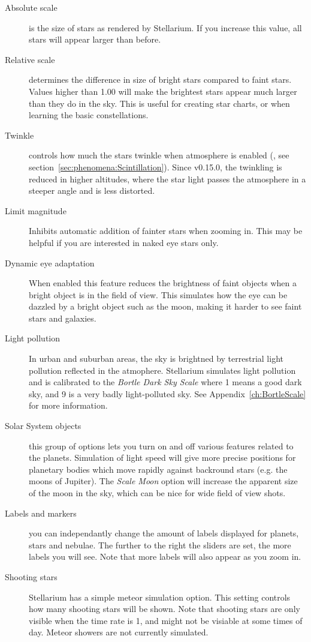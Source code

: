 \begin{description}
\item[Absolute scale] is the size of stars as rendered by
  Stellarium. If you increase this value, all stars will appear larger
  than before.
\item[Relative scale] determines the difference in size of bright
  stars compared to faint stars. Values higher than 1.00 will make the
  brightest stars appear much larger than they do in the sky. This is
  useful for creating star charts, or when learning the basic
  constellations.
\item[Twinkle] controls how much the stars twinkle when atmosphere is
  enabled (, see section~\ref{sec:phenomena:Scintillation}). 
  Since v0.15.0, the twinkling is reduced in higher altitudes,
  where the star light passes the atmosphere in a steeper angle and is
  less distorted.
\item[Limit magnitude] Inhibits automatic addition of fainter stars
  when zooming in. This may be helpful if you are interested in naked
  eye stars only.
\item[Dynamic eye adaptation] When enabled this feature reduces the
  brightness of faint objects when a bright object is in the field of
  view. This simulates how the eye can be dazzled by a bright object
  such as the moon, making it harder to see faint stars and galaxies.
\item[Light pollution] In urban and suburban areas, the sky is
  brightned by terrestrial light pollution reflected in the atmophere.
  Stellarium simulates light pollution and is calibrated to the
  \emph{Bortle Dark Sky Scale} where 1 means a good dark sky, and 9 is
  a very badly light-polluted sky. See Appendix~\ref{ch:BortleScale}
  for more information.
\item[Solar System objects] this group of options lets you turn on
  and off various features related to the planets. Simulation of light
  speed will give more precise positions for planetary bodies which move
  rapidly against backround stars (e.g. the moons of Jupiter). The
  \emph{Scale Moon} option will increase the apparent size of the moon
  in the sky, which can be nice for wide field of view shots.
\item[Labels and markers] you can independantly change the amount of
  labels displayed for planets, stars and nebulae. The further to the
  right the sliders are set, the more labels you will see. Note that
  more labels will also appear as you zoom in.
\item[Shooting stars] Stellarium has a simple meteor simulation
  option. This setting controls how many shooting stars will be shown.
  Note that shooting stars are only visible when the time rate is 1, and
  might not be visiable at some times of day. Meteor showers are not
  currently simulated.
\end{description}

